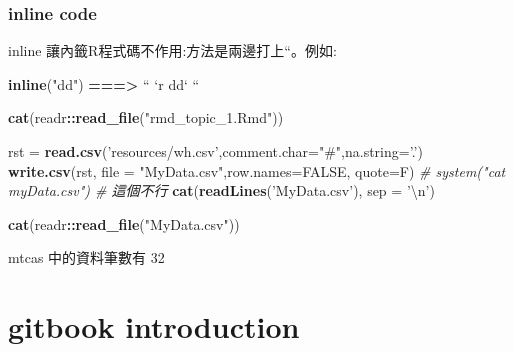 \documentclass[]{book}
\newenvironment{Shaded}{\begin{snugshade}}{\end{snugshade}}
\newcommand{\KeywordTok}[1]{\textcolor[rgb]{0.13,0.29,0.53}{\textbf{#1}}}
\newcommand{\DataTypeTok}[1]{\textcolor[rgb]{0.13,0.29,0.53}{#1}}
\newcommand{\CharTok}[1]{\textcolor[rgb]{0.31,0.60,0.02}{#1}}
\newcommand{\StringTok}[1]{\textcolor[rgb]{0.31,0.60,0.02}{#1}}
\newcommand{\CommentTok}[1]{\textcolor[rgb]{0.56,0.35,0.01}{\textit{#1}}}
\newcommand{\OtherTok}[1]{\textcolor[rgb]{0.56,0.35,0.01}{#1}}
\newcommand{\OperatorTok}[1]{\textcolor[rgb]{0.81,0.36,0.00}{\textbf{#1}}}
\newcommand{\ErrorTok}[1]{\textcolor[rgb]{0.64,0.00,0.00}{\textbf{#1}}}
\newcommand{\NormalTok}[1]{#1}
\theoremstyle{definition}
\theoremstyle{definition}
\theoremstyle{definition}
\theoremstyle{remark}
\begin{document}
\subsection{inline code}\label{inline-code}

inline 讓內籤R程式碼不作用:方法是兩邊打上``。例如:

\begin{Shaded}
\begin{Highlighting}[]
\KeywordTok{inline}\NormalTok{(}\StringTok{"dd"}\NormalTok{)}
\OperatorTok{==}\ErrorTok{=>}\StringTok{  ``} \StringTok{`}\DataTypeTok{r dd}\StringTok{`} \StringTok{``}
\end{Highlighting}
\end{Shaded}

\begin{Shaded}
\begin{Highlighting}[]
\KeywordTok{cat}\NormalTok{(readr}\OperatorTok{::}\KeywordTok{read_file}\NormalTok{(}\StringTok{"rmd_topic_1.Rmd"}\NormalTok{))}
\end{Highlighting}
\end{Shaded}

\begin{Shaded}
\begin{Highlighting}[]
\NormalTok{rst =}\StringTok{ }\KeywordTok{read.csv}\NormalTok{(}\StringTok{'resources/wh.csv'}\NormalTok{,}\DataTypeTok{comment.char=}\StringTok{"#"}\NormalTok{,}\DataTypeTok{na.string=}\StringTok{'.'}\NormalTok{)}
\KeywordTok{write.csv}\NormalTok{(rst, }\DataTypeTok{file =} \StringTok{"MyData.csv"}\NormalTok{,}\DataTypeTok{row.names=}\OtherTok{FALSE}\NormalTok{, }\DataTypeTok{quote=}\NormalTok{F)}
\CommentTok{# system("cat myData.csv") # 這個不行}
\KeywordTok{cat}\NormalTok{(}\KeywordTok{readLines}\NormalTok{(}\StringTok{'MyData.csv'}\NormalTok{), }\DataTypeTok{sep =} \StringTok{'}\CharTok{\textbackslash{}n}\StringTok{'}\NormalTok{)}
\end{Highlighting}
\end{Shaded}

\begin{Shaded}
\begin{Highlighting}[]
\KeywordTok{cat}\NormalTok{(readr}\OperatorTok{::}\KeywordTok{read_file}\NormalTok{(}\StringTok{"MyData.csv"}\NormalTok{))}
\end{Highlighting}
\end{Shaded}

mtcas 中的資料筆數有 32

\chapter{gitbook introduction}\label{gitbook-introduction}
\end{document}
